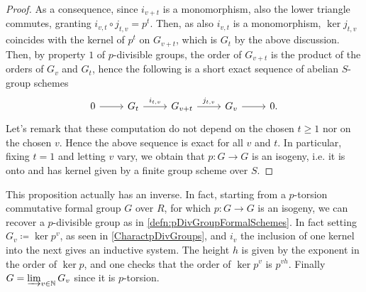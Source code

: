 \documentclass[../Main]{subfiles}
\begin{document}
\begin{proof}
	As a consequence, since $i_{v+t}$ is a monomorphism,
	also the lower triangle commutes, granting
	$i_{v,t} \circ j_{t,v} = p^t$.
	Then, as also $i_{v,t}$ is a monomorphism, $\ker j_{t,v}$
	coincides with the kernel of $p^t$ on $G_{v+t}$, 
	which is $G_t$ by the above discussion.
	Then, by property $1$ of $p$-divisible groups,
	the order of $G_{v+t}$ is the product of the orders
	of $G_v$ and $G_t$, hence the following is a
	short exact sequence of abelian $S$-group schemes
	\begin{equation}\label{eqn:pDivGrInducedmultiplication}
	\begin{tikzcd}
		0 \arrow[r, "", rightarrow] &
		G_t \arrow[r, "i_{t,v}", rightarrow] &
		G_{v+t} \arrow[r, "j_{t,v}", rightarrow] &
		G_v \arrow[r, "", rightarrow] &
		0
	.\end{tikzcd}
	\end{equation}
	Let's remark that these computation do not depend on the chosen $t \geq 1$
	nor on the chosen $v$.
	Hence the above sequence is exact for all $v$ and $t$.
	In particular, fixing $t=1$ and letting $v$ vary,
	we obtain that $p\colon G \to G$ is an isogeny,
	i.e. it is onto and has kernel given by a finite group scheme over $S$.
\end{proof}


\begin{rem}[]
	This proposition actually has an inverse.
	In fact, starting from a $p$-torsion commutative formal group $G$ over
	$R$, for which $p\colon G \to G$ is an isogeny, we can recover a $p$-divisible
	group as in \cref{defn:pDivGroupFormalSchemes}.
	In fact setting $G_v \coloneqq \ker p^v$, as seen in \cref{CharactpDivGroups},
	and $i_v$ the inclusion of one kernel into the next gives an inductive system.
	The height $h$ is given by the exponent in the order of $\ker p$,
	and one checks that the order of $\ker p^v$ is $p^{vh}$.
	Finally $G = \varinjlim_{v \in \mathbb{N}} G_v$ since it is $p$-torsion.
\end{rem}
\end{document}
